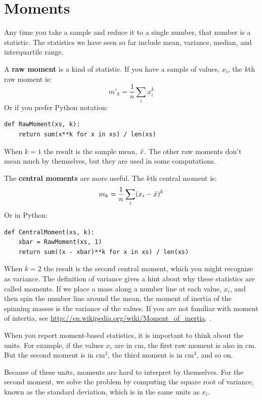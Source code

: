 \documentclass[12pt]{book}
\begin{document}
\section{Moments}

Any time you take a sample and reduce it to a single number, that
number is a statistic.  The statistics we have seen so far include
mean, variance, median, and interquartile range.

A {\bf raw moment} is a kind of statistic.  If you have a sample of
values, $x_i$, the $k$th raw moment is:
%
\[ m'_k = \frac{1}{n} \sum_i x_i^k \]
%
Or if you prefer Python notation:

\begin{verbatim}
def RawMoment(xs, k):
    return sum(x**k for x in xs) / len(xs)
\end{verbatim}

When $k=1$ the result is the sample mean, $\bar{x}$.  The other
raw moments don't mean much by themselves, but they are used
in some computations.

The {\bf central moments} are more useful.  The
$k$th central moment is:
%
\[ m_k = \frac{1}{n} \sum_i (x_i - \bar{x})^k \]
%
Or in Python:

\begin{verbatim}
def CentralMoment(xs, k):
    xbar = RawMoment(xs, 1)
    return sum((x - xbar)**k for x in xs) / len(xs)
\end{verbatim}

When $k=2$ the result is the second central moment, which you might
recognize as variance.  The definition of variance gives a hint about
why these statistics are called moments.  If we place a mass along a
number line at each value, $x_i$, and then spin the number line around
the mean, the moment of inertia of the spinning masses is the variance
of the values.  If you are not familiar with moment of intertia, see
\url{http://en.wikipedia.org/wiki/Moment_of_inertia}.  .

When you report moment-based statistics, it is important to think
about the units.  For example, if the values $x_i$ are in cm, the
first raw moment is also in cm.  But the second moment is in
cm$^2$, the third moment is in cm$^3$, and so on.

Because of these units, moments are hard to interpret by themselves.
For the second moment, we solve the problem by computing the square
root of variance, known as the standard deviation, which is in the
same units as $x_i$.
\end{document}
